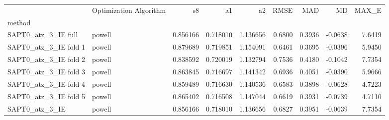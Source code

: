 \begin{tabular}{llrrrrrrr}
 & Optimization Algorithm & s8 & a1 & a2 & RMSE & MAD & MD & MAX_E \\
method &  &  &  &  &  &  &  &  \\
SAPT0_atz_3_IE full & powell & 0.856166 & 0.718010 & 1.136656 & 0.6800 & 0.3936 & -0.0638 & 7.6419 \\
SAPT0_atz_3_IE fold 1 & powell & 0.879689 & 0.719851 & 1.154091 & 0.6461 & 0.3695 & -0.0396 & 5.9450 \\
SAPT0_atz_3_IE fold 2 & powell & 0.838592 & 0.720019 & 1.132794 & 0.7536 & 0.4180 & -0.1042 & 7.7354 \\
SAPT0_atz_3_IE fold 3 & powell & 0.863845 & 0.716697 & 1.141342 & 0.6936 & 0.4051 & -0.0390 & 5.9666 \\
SAPT0_atz_3_IE fold 4 & powell & 0.859489 & 0.716630 & 1.140536 & 0.6583 & 0.3898 & -0.0628 & 4.7223 \\
SAPT0_atz_3_IE fold 5 & powell & 0.865402 & 0.716508 & 1.147044 & 0.6619 & 0.3931 & -0.0739 & 4.7110 \\
SAPT0_atz_3_IE & powell & 0.856166 & 0.718010 & 1.136656 & 0.6827 & 0.3951 & -0.0639 & 7.7354 \\
\end{tabular}
